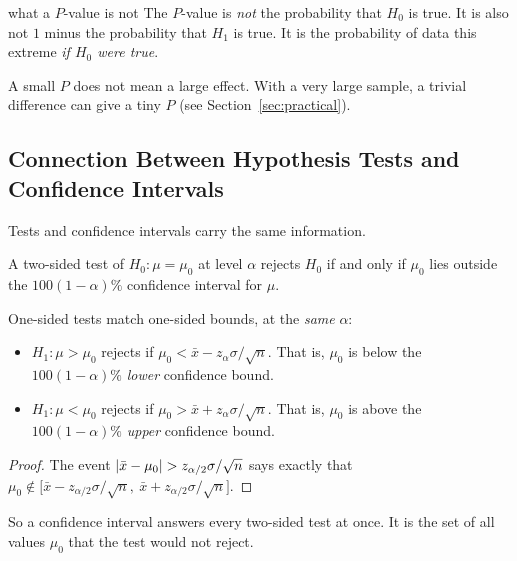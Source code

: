 \begin{pitfall}{what a $P$-value is not}
The $P$-value is \emph{not} the probability that $H_0$ is true. It is also not $1$ minus the probability that $H_1$ is true. It is the probability of data this extreme \emph{if $H_0$ were true}.

A small $P$ does not mean a large effect. With a very large sample, a trivial difference can give a tiny $P$ (see Section~\ref{sec:practical}).
\end{pitfall}

\subsection{Connection Between Hypothesis Tests and Confidence Intervals}

Tests and confidence intervals carry the same information.

\begin{theorem}[Duality]\label{thm:duality}
A two-sided test of $H_0:\mu=\mu_0$ at level $\alpha$ rejects $H_0$ if and only if $\mu_0$ lies outside the $100(1-\alpha)\%$ confidence interval for $\mu$.

One-sided tests match one-sided bounds, at the \emph{same} $\alpha$:
\begin{itemize}
  \item $H_1:\mu>\mu_0$ rejects if $\mu_0<\bar{x}-z_\alpha\sigma/\sqrt n$. That is, $\mu_0$ is below the $100(1-\alpha)\%$ \emph{lower} confidence bound.
  \item $H_1:\mu<\mu_0$ rejects if $\mu_0>\bar{x}+z_\alpha\sigma/\sqrt n$. That is, $\mu_0$ is above the $100(1-\alpha)\%$ \emph{upper} confidence bound.
\end{itemize}
\end{theorem}

\begin{proof}
The event $\lvert\bar{x}-\mu_0\rvert>z_{\alpha/2}\sigma/\sqrt n$ says exactly that $\mu_0\notin\big[\bar{x}-z_{\alpha/2}\sigma/\sqrt n,\ \bar{x}+z_{\alpha/2}\sigma/\sqrt n\big]$.
\end{proof}

So a confidence interval answers every two-sided test at once. It is the set of all values $\mu_0$ that the test would not reject.

